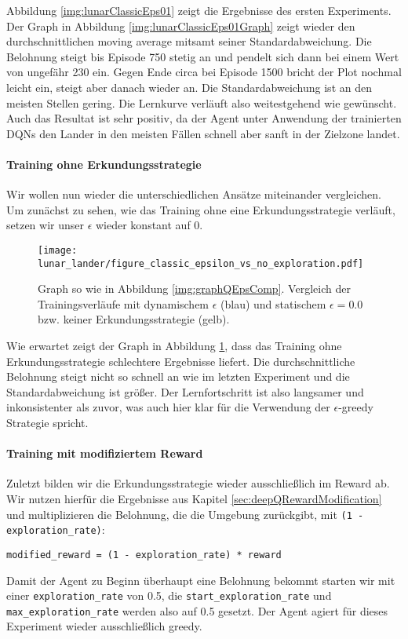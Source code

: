 Abbildung \ref{img:lunarClassicEps01} zeigt die Ergebnisse des ersten Experiments. Der Graph in Abbildung \ref{img:lunarClassicEps01Graph} zeigt wieder den durchschnittlichen moving average mitsamt seiner Standardabweichung. Die Belohnung steigt bis Episode 750 stetig an und pendelt sich dann bei einem Wert von ungefähr 230 ein. Gegen Ende circa bei Episode 1500 bricht der Plot nochmal leicht ein, steigt aber danach wieder an. Die Standardabweichung ist an den meisten Stellen gering. Die Lernkurve verläuft also weitestgehend wie gewünscht. Auch das Resultat ist sehr positiv, da der Agent unter Anwendung der trainierten DQNs den Lander in den meisten Fällen schnell aber sanft in der Zielzone landet.

\paragraph{Training ohne Erkundungsstrategie}
Wir wollen nun wieder die unterschiedlichen Ansätze miteinander vergleichen. Um zunächst zu sehen, wie das Training ohne eine Erkundungsstrategie verläuft, setzen wir unser $ \epsilon $ wieder konstant auf 0.

\begin{figure}[h!]
    \centering
    \texttt{[image: lunar\_lander/figure\_classic\_epsilon\_vs\_no\_exploration.pdf]}
    \caption{Graph so wie in Abbildung \ref{img:graphQEpsComp}. Vergleich der Trainingsverläufe mit dynamischem $ \epsilon $ (blau) und statischem $ \epsilon = 0.0 $ bzw. keiner Erkundungsstrategie (gelb).} \label{img:lunarClassicEps01VsNoExploration}
\end{figure}

Wie erwartet zeigt der Graph in Abbildung \ref{img:lunarClassicEps01VsNoExploration}, dass das Training ohne Erkundungsstrategie schlechtere Ergebnisse liefert. Die durchschnittliche Belohnung steigt nicht so schnell an wie im letzten Experiment und die Standardabweichung ist größer. Der Lernfortschritt ist also langsamer und inkonsistenter als zuvor, was auch hier klar für die Verwendung der $ \epsilon $-greedy Strategie spricht.

\paragraph{Training mit modifiziertem Reward}
Zuletzt bilden wir die Erkundungsstrategie wieder ausschließlich im Reward ab. Wir nutzen hierfür die Ergebnisse aus Kapitel \ref{sec:deepQRewardModification} und multiplizieren die Belohnung, die die Umgebung zurückgibt, mit \texttt{(1 - exploration_rate)}:
\begin{verbatim}
modified_reward = (1 - exploration_rate) * reward
\end{verbatim}
Damit der Agent zu Beginn überhaupt eine Belohnung bekommt starten wir mit einer \texttt{exploration_rate} von 0.5, die \texttt{start_exploration_rate} und \texttt{max_exploration_rate} werden also auf 0.5 gesetzt. Der Agent agiert für dieses Experiment wieder ausschließlich greedy.

